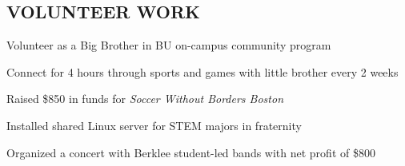 \documentclass[10pt]{article}
\begin{document}
\begin{FlushLeft}
  \section{VOLUNTEER WORK}

  \begin{itemize}{
    \item Volunteer as a Big Brother in BU on-campus community program
    \item Connect for 4 hours through sports and games with little brother every 2 weeks
    }
  \end{itemize}

  
  \begin{itemize}{
      
    \item Raised \$850 in funds for \textit{Soccer Without Borders Boston}
    }
  \end{itemize}
  
  \begin{itemize}{
    \item Installed shared Linux server for STEM majors in fraternity
    \item Organized a concert with Berklee student-led bands with net profit of \$800
    }
  \end{itemize}

  

\end{FlushLeft}
\end{document}
